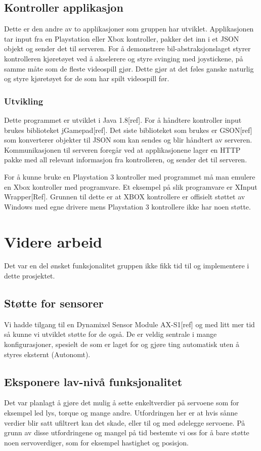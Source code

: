\documentclass[12pt]{report}
\begin{document}
\section{Kontroller applikasjon}
Dette er den andre av to applikasjoner som gruppen har utviklet. Applikasjonen tar input fra en Playstation eller Xbox kontroller, pakker det inn i et JSON objekt og sender det til serveren. For å demonstrere bil-abstraksjonslaget styrer kontrolleren kjøretøyet ved å akselerere og styre svinging med joystickene, på samme måte som de fleste videospill gjør. Dette gjør at det føles ganske naturlig og styre kjøretøyet for de som har spilt videospill før.

\subsection{Utvikling}
Dette programmet er utviklet i Java 1.8[ref]. For å håndtere kontroller input brukes biblioteket jGamepad[ref]. Det siste biblioteket som brukes er GSON[ref] som konverterer objekter til JSON som kan sendes og blir håndtert av serveren. Kommunikasjonen til serveren foregår ved at applikasjonene lager en HTTP pakke med all relevant informasjon fra kontrolleren, og sender det til serveren.

For å kunne bruke en Playstation 3 kontroller med programmet må man emulere en Xbox kontroller med programvare. Et eksempel på slik programvare er XInput Wrapper[Ref]. Grunnen til dette er at XBOX kontrollere er offisielt støttet av Windows med egne drivere mens Playstation 3 kontrollere ikke har noen støtte.

\clearpage

\chapter{Videre arbeid}
Det var en del ønsket funksjonalitet gruppen ikke fikk tid til og implementere i dette prosjektet.

\section{Støtte for sensorer}
Vi hadde tilgang til en Dynamixel Sensor Module AX-S1[ref] og med litt mer tid så kunne vi utviklet støtte for de også. De er veldig sentrale i mange konfigurasjoner, spesielt de som er laget for og gjøre ting automatisk uten å styres eksternt (Autonomt).

\section{Eksponere lav-nivå funksjonalitet}
Det var planlagt å gjøre det mulig å sette enkeltverdier på servoene som for eksempel led lys, torque og mange andre. Utfordringen her er at hvis sånne verdier blir satt ufiltrert kan det skade, eller til og med ødelegge servoene. På grunn av disse utfordringene og mangel på tid bestemte vi oss for å bare støtte noen servoverdiger, som for eksempel hastighet og posisjon.
\end{document}
